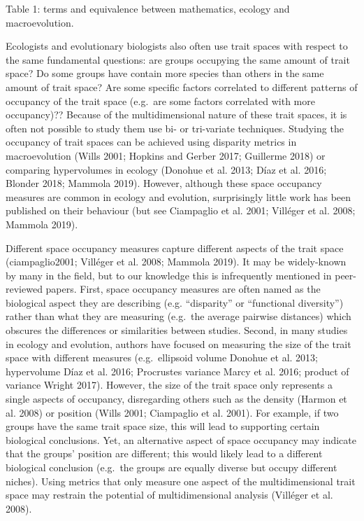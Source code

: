 \documentclass[]{article}
\begin{document}
Table 1: terms and equivalence between mathematics, ecology and
macroevolution.

Ecologists and evolutionary biologists also often use trait spaces with
respect to the same fundamental questions: are groups occupying the same
amount of trait space? Do some groups have contain more species than
others in the same amount of trait space? Are some specific factors
correlated to different patterns of occupancy of the trait space
(e.g.~are some factors correlated with more occupancy)?? Because of the
multidimensional nature of these trait spaces, it is often not possible
to study them use bi- or tri-variate techniques. Studying the occupancy
of trait spaces can be achieved using disparity metrics in
macroevolution (Wills 2001; Hopkins and Gerber 2017; Guillerme 2018) or
comparing hypervolumes in ecology (Donohue et al. 2013; Díaz et al.
2016; Blonder 2018; Mammola 2019). However, although these space
occupancy measures are common in ecology and evolution, surprisingly
little work has been published on their behaviour (but see Ciampaglio et
al. 2001; Villéger et al. 2008; Mammola 2019).

Different space occupancy measures capture different aspects of the
trait space (ciampaglio2001; Villéger et al. 2008; Mammola 2019). It may
be widely-known by many in the field, but to our knowledge this is
infrequently mentioned in peer-reviewed papers. First, space occupancy
measures are often named as the biological aspect they are describing
(e.g. ``disparity'' or ``functional diversity'') rather than what they
are measuring (e.g.~the average pairwise distances) which obscures the
differences or similarities between studies. Second, in many studies in
ecology and evolution, authors have focused on measuring the size of the
trait space with different measures (e.g.~ellipsoid volume Donohue et
al. 2013; hypervolume Díaz et al. 2016; Procrustes variance Marcy et al.
2016; product of variance Wright 2017). However, the size of the trait
space only represents a single aspects of occupancy, disregarding others
such as the density (Harmon et al. 2008) or position (Wills 2001;
Ciampaglio et al. 2001). For example, if two groups have the same trait
space size, this will lead to supporting certain biological conclusions.
Yet, an alternative aspect of space occupancy may indicate that the
groups' position are different; this would likely lead to a different
biological conclusion (e.g.~the groups are equally diverse but occupy
different niches). Using metrics that only measure one aspect of the
multidimensional trait space may restrain the potential of
multidimensional analysis (Villéger et al. 2008).
\end{document}
